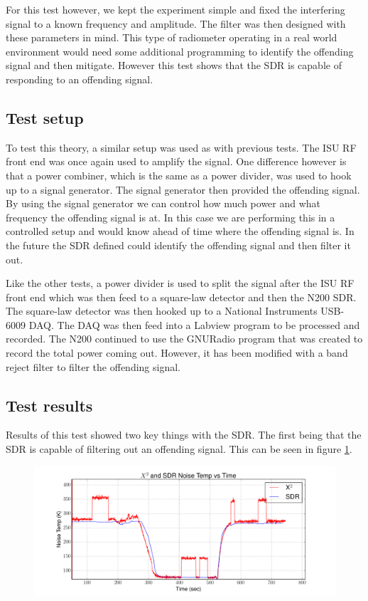 For this test however, we kept the experiment simple and fixed the interfering signal to a known frequency and amplitude.  The filter was then designed with these parameters in mind.  This type of radiometer operating in a real world environment would need some additional programming to identify the offending signal and then mitigate.  However this test shows that the SDR is capable of responding to an offending signal.

\subsection{Test setup}
To test this theory, a similar setup was used as with previous tests.  The ISU RF front end was once again used to amplify the signal.  One difference however is that a power combiner, which is the same as a power divider, was used to hook up to a signal generator.  The signal generator then provided the offending signal.  By using the signal generator we can control how much power and what frequency the offending signal is at.  In this case we are performing this in a controlled setup and would know ahead of time where the offending signal is.  In the future the SDR defined could identify the offending signal and then filter it out.

Like the other tests, a power divider is used to split the signal after the ISU RF front end which was then feed to a square-law detector and then the N200 SDR.  The square-law detector was then hooked up to a National Instruments USB-6009 DAQ.  The DAQ was then feed into a Labview program to be processed and recorded.  The N200 continued to use the GNURadio program that was created to record the total power coming out.  However, it has been modified with a band reject filter to filter the offending signal.

\subsection{Test results}
Results of this test showed two key things with the SDR.  The first being that the SDR is capable of filtering out an offending signal.  This can be seen in figure \ref{filter_on}.

\begin{figure}[h!tb] \centering

\includegraphics[width=\textwidth]{Experiments/Exp4/calib_filtered_both.pdf}

\label{filter_on}
\end{figure}

